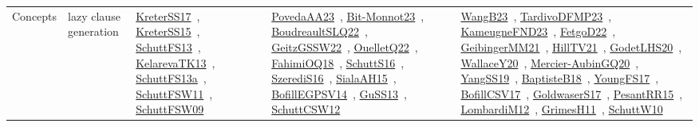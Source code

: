 {\begin{longtable}{lp{3cm}>{\raggedright\arraybackslash}p{6cm}>{\raggedright\arraybackslash}p{6cm}>{\raggedright\arraybackslash}p{8cm}}
Concepts & lazy clause generation & \href{works/KreterSS17.pdf}{KreterSS17}~\cite{KreterSS17}, \href{works/KreterSS15.pdf}{KreterSS15}~\cite{KreterSS15}, \href{works/SchuttFS13.pdf}{SchuttFS13}~\cite{SchuttFS13}, \href{works/KelarevaTK13.pdf}{KelarevaTK13}~\cite{KelarevaTK13}, \href{works/SchuttFS13a.pdf}{SchuttFS13a}~\cite{SchuttFS13a}, \href{works/SchuttFSW11.pdf}{SchuttFSW11}~\cite{SchuttFSW11}, \href{works/SchuttFSW09.pdf}{SchuttFSW09}~\cite{SchuttFSW09} & \href{works/PovedaAA23.pdf}{PovedaAA23}~\cite{PovedaAA23}, \href{works/Bit-Monnot23.pdf}{Bit-Monnot23}~\cite{Bit-Monnot23}, \href{works/BoudreaultSLQ22.pdf}{BoudreaultSLQ22}~\cite{BoudreaultSLQ22}, \href{works/GeitzGSSW22.pdf}{GeitzGSSW22}~\cite{GeitzGSSW22}, \href{works/OuelletQ22.pdf}{OuelletQ22}~\cite{OuelletQ22}, \href{works/FahimiOQ18.pdf}{FahimiOQ18}~\cite{FahimiOQ18}, \href{works/SchuttS16.pdf}{SchuttS16}~\cite{SchuttS16}, \href{works/SzerediS16.pdf}{SzerediS16}~\cite{SzerediS16}, \href{works/SialaAH15.pdf}{SialaAH15}~\cite{SialaAH15}, \href{works/BofillEGPSV14.pdf}{BofillEGPSV14}~\cite{BofillEGPSV14}, \href{works/GuSS13.pdf}{GuSS13}~\cite{GuSS13}, \href{works/SchuttCSW12.pdf}{SchuttCSW12}~\cite{SchuttCSW12} & \href{works/WangB23.pdf}{WangB23}~\cite{WangB23}, \href{works/TardivoDFMP23.pdf}{TardivoDFMP23}~\cite{TardivoDFMP23}, \href{works/KameugneFND23.pdf}{KameugneFND23}~\cite{KameugneFND23}, \href{works/FetgoD22.pdf}{FetgoD22}~\cite{FetgoD22}, \href{works/GeibingerMM21.pdf}{GeibingerMM21}~\cite{GeibingerMM21}, \href{works/HillTV21.pdf}{HillTV21}~\cite{HillTV21}, \href{works/GodetLHS20.pdf}{GodetLHS20}~\cite{GodetLHS20}, \href{works/WallaceY20.pdf}{WallaceY20}~\cite{WallaceY20}, \href{works/Mercier-AubinGQ20.pdf}{Mercier-AubinGQ20}~\cite{Mercier-AubinGQ20}, \href{works/YangSS19.pdf}{YangSS19}~\cite{YangSS19}, \href{works/BaptisteB18.pdf}{BaptisteB18}~\cite{BaptisteB18}, \href{works/YoungFS17.pdf}{YoungFS17}~\cite{YoungFS17}, \href{works/BofillCSV17.pdf}{BofillCSV17}~\cite{BofillCSV17}, \href{works/GoldwaserS17.pdf}{GoldwaserS17}~\cite{GoldwaserS17}, \href{works/PesantRR15.pdf}{PesantRR15}~\cite{PesantRR15}, \href{works/LombardiM12.pdf}{LombardiM12}~\cite{LombardiM12}, \href{works/GrimesH11.pdf}{GrimesH11}~\cite{GrimesH11}, \href{works/SchuttW10.pdf}{SchuttW10}~\cite{SchuttW10}\\

\end{longtable}}
